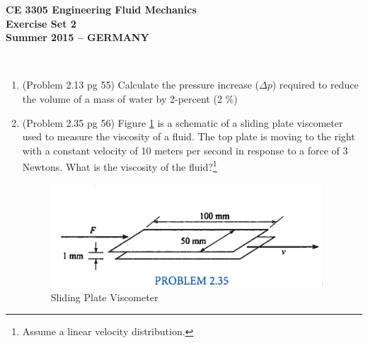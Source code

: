 \documentclass[12pt]{article}
\begin{document}
\begingroup
\begin{center}
{\textbf{{ CE 3305 Engineering Fluid Mechanics} \\ Exercise Set 2 \\ Summer 2015 -- GERMANY} }
\end{center}
\endgroup
\begingroup
~\newline

\begin{enumerate}
\item (Problem 2.13 pg 55)
Calculate the pressure increase ($\Delta p$) required to reduce the volume of a mass of water by 2-percent (2 $\%$) 
\clearpage
\item (Problem 2.35 pg 56)
Figure \ref{fig:SlidingPlateViscosity} is a schematic of a sliding plate viscometer used to measure the viscosity of a fluid. 
The top plate is moving to the right with a constant velocity of 10 meters per second in response to a force of 3 Newtons.
What is the viscosity of the fluid?\footnote{Assume a linear velocity distribution.}
\begin{figure}[htbp] %
   \centering
   \includegraphics[width=4in]{SlidingPlateViscosity.jpg} 
   \caption{Sliding Plate Viscometer}
   \label{fig:SlidingPlateViscosity}
\end{figure}

\end{enumerate}
\end{document}
